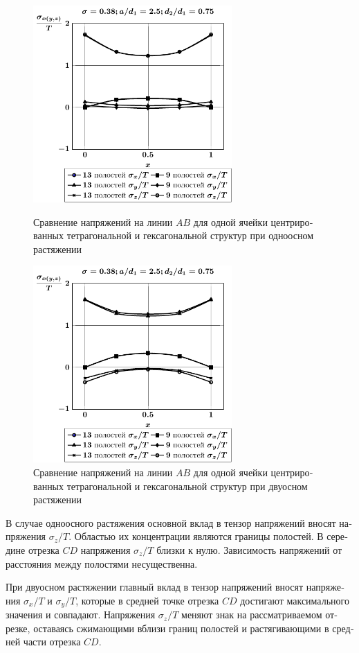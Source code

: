 \begin{russian}
\begin{figure}[h!]
\centering\footnotesize
\parbox[b]{7.5cm}{\centering\includegraphics[width=7.6cm]{cav13-9-a25-t1.pdf}
\caption{Сравнение напряжений на линии $AB$ для одной ячейки центрированных тетрагональной и гексагональной структур при одноосном растяжении 
\label{f:9:56}}}\hfil\hfil
\parbox[b]{7.5cm}{\centering\includegraphics[width=7.6cm]{cav13-9-a25-t2.pdf}
\caption{Сравнение напряжений на линии $AB$ для одной ячейки центрированных тетрагональной и гексагональной структур при двуосном растяжении
\label{f:9:57}}}
\end{figure}

В случае одноосного растяжения основной вклад в тензор напряжений вносят напряжения $\sigma_z/T$. Областью их концентрации являются границы полостей. В середине отрезка $CD$ напряжения $\sigma_z/T$ близки к нулю. Зависимость напряжений от расстояния между полостями несущественна.

При двуосном растяжении главный вклад в тензор напряжений вносят напряжения $\sigma_x/T$ и $\sigma_y/T$, которые в средней точке отрезка $CD$ достигают максимального значения и совпадают. Напряжения $\sigma_z/T$ меняют знак на рассматриваемом отрезке, оставаясь сжимающими вблизи границ полостей и растягивающими в средней части отрезка $CD$.


\end{russian}
